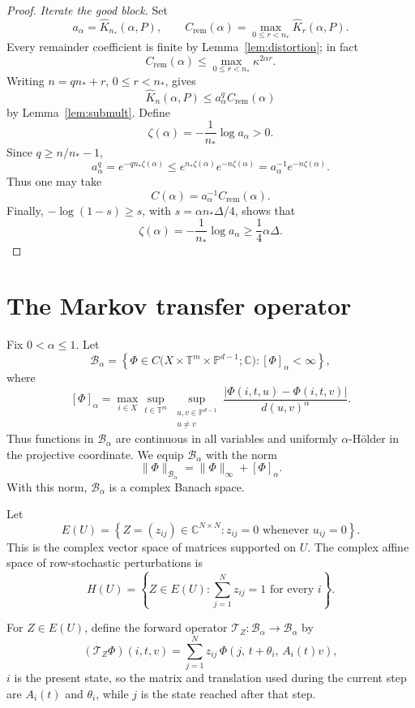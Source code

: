 \documentclass[11pt,a4paper]{amsart}
\newcommand{\T}{\mathbb T}
\newcommand{\C}{\mathbb C}
\newcommand{\PP}{\mathbb P}
\begin{document}
\begin{proof}
\smallskip
\noindent\emph{Iterate the good block.}
Set
\[
 a_\alpha=\widehat K_{n_*}(\alpha,P),\qquad
 C_{\mathrm{rem}}(\alpha)
 =\max_{0\le r<n_*}\widehat K_r(\alpha,P).
\]
Every remainder coefficient is finite by
Lemma~\ref{lem:distortion}; in fact
\[
 C_{\mathrm{rem}}(\alpha)
 \le\max_{0\le r<n_*}\kappa^{2\alpha r}.
\]
Writing \(n=qn_*+r\), \(0\le r<n_*\), gives
\[
 \widehat K_n(\alpha,P)
 \le
 a_\alpha^qC_{\mathrm{rem}}(\alpha)
\]
by Lemma~\ref{lem:submult}.  Define
\[
 \zeta(\alpha)=-\frac1{n_*}\log a_\alpha>0.
\]
Since \(q\ge n/n_*-1\),
\[
 a_\alpha^q
 =e^{-qn_*\zeta(\alpha)}
 \le e^{n_*\zeta(\alpha)}e^{-n\zeta(\alpha)}
 =a_\alpha^{-1}e^{-n\zeta(\alpha)}.
\]
Thus one may take
\[
 C(\alpha)=a_\alpha^{-1}C_{\mathrm{rem}}(\alpha).
\]
Finally, \(-\log(1-s)\ge s\), with
\(s=\alpha n_*\Delta/4\), shows that
\[
 \zeta(\alpha)
 =-\frac1{n_*}\log a_\alpha
 \ge\frac14\alpha\Delta.
\]
\end{proof}

\section{The Markov transfer operator}
Fix \(0<\alpha\leq1\).  Let
\[
 \mathcal B_\alpha
 =
 \left\{
 \Phi\in
 C\bigl(X\times\T^m\times\PP^{d-1};\C\bigr):
 [\Phi]_\alpha<\infty
 \right\},
\]
where
\begin{equation}\label{eq:projective-holder-seminorm}
 [\Phi]_\alpha
 =
 \max_{i\in X}
 \sup_{t\in\T^m}
 \sup_{\substack{u, v\in\PP^{d-1}\\
                  u\neq v}}
 \frac{
 |\Phi(i,t,u)-\Phi(i,t,v)|
 }{
 d(u,v)^\alpha
 }.
\end{equation}
Thus functions in \(\mathcal B_\alpha\) are continuous in all
variables and uniformly \(\alpha\)-Hölder in the projective
coordinate.  We equip \(\mathcal B_\alpha\) with the norm
\begin{equation}\label{eq:projective-holder-norm}
 \|\Phi\|_{\mathcal B_\alpha}
 =
 \|\Phi\|_\infty+[\Phi]_\alpha.
\end{equation}
With this norm, \(\mathcal B_\alpha\) is a complex Banach space.

Let
\[
 E(U)
 =
 \left\{
 Z=(z_{ij})\in\C^{N\times N}:
 z_{ij}=0\text{ whenever }u_{ij}=0
 \right\}.
\]
This is the complex vector space of matrices supported on \(U\).
The complex affine space of row-stochastic perturbations is
\[
 H(U)
 =
 \left\{
 Z\in E(U):
 \sum_{j=1}^Nz_{ij}=1
 \text{ for every }i
 \right\}.
\]

For \(Z\in E(U)\), define the forward operator
\(\mathcal T_Z:\mathcal B_\alpha\to\mathcal B_\alpha\) by
\begin{equation}\label{eq:forward-Markov-operator}
 (\mathcal T_Z\Phi)(i,t, v)
 =
 \sum_{j=1}^Nz_{ij}\,
 \Phi\left(
 j,\,
 t+\theta_i,\,
 A_i(t)v
 \right),
\end{equation}
%
\(i\) is the present state, so the matrix and translation used
during the current step are \(A_i(t)\) and \(\theta_i\), while \(j\)
is the state reached after that step.
\end{document}
